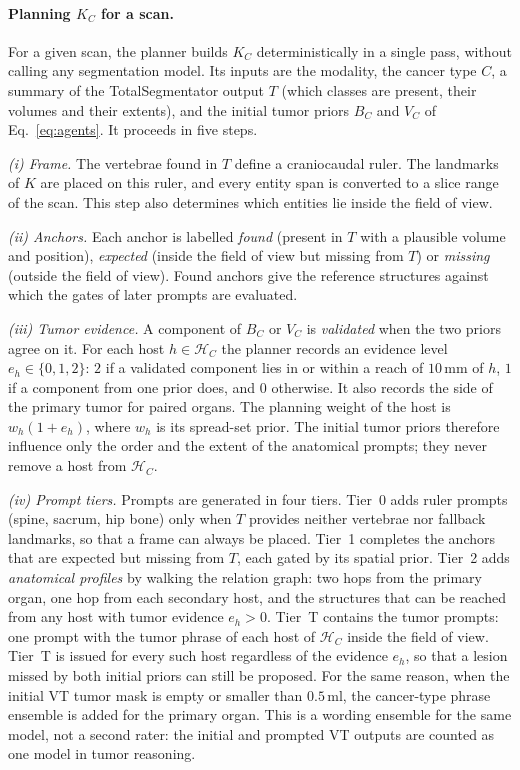 \documentclass[fleqn,10pt]{olplainarticle}
\begin{document}
\paragraph{Planning $K_C$ for a scan.}
For a given scan, the planner builds $K_C$ deterministically in a single pass, without calling any segmentation model.
Its inputs are the modality, the cancer type $C$, a summary of the TotalSegmentator output $T$ (which classes are
present, their volumes and their extents), and the initial tumor priors $B_C$ and $V_C$ of Eq.~\eqref{eq:agents}.
It proceeds in five steps.

\emph{(i) Frame.} The vertebrae found in $T$ define a craniocaudal ruler. The landmarks of $K$ are placed on this ruler,
and every entity span is converted to a slice range of the scan. This step also determines which entities lie inside the
field of view.

\emph{(ii) Anchors.} Each anchor is labelled \emph{found} (present in $T$ with a plausible volume and position),
\emph{expected} (inside the field of view but missing from $T$) or \emph{missing} (outside the field of view). Found
anchors give the reference structures against which the gates of later prompts are evaluated.

\emph{(iii) Tumor evidence.} A component of $B_C$ or $V_C$ is \emph{validated} when the two priors agree on it. For each
host $h\in\mathcal{H}_C$ the planner records an evidence level $e_h\in\{0,1,2\}$: $2$ if a validated component lies in
or within a reach of $10$\,mm of $h$, $1$ if a component from one prior does, and $0$ otherwise. It also records the
side of the primary tumor for paired organs. The planning weight of the host is $w_h(1+e_h)$, where $w_h$ is its
spread-set prior. The initial tumor priors therefore influence only the order and the extent of the anatomical
prompts; they never remove a host from $\mathcal{H}_C$.

\emph{(iv) Prompt tiers.} Prompts are generated in four tiers. Tier~0 adds ruler prompts (spine, sacrum, hip bone) only
when $T$ provides neither vertebrae nor fallback landmarks, so that a frame can always be placed. Tier~1 completes the anchors that are expected but missing from $T$, each gated by its
spatial prior. Tier~2 adds \emph{anatomical profiles} by walking the relation graph: two hops from the primary organ,
one hop from each secondary host, and the structures that can be reached from any host with tumor evidence
$e_h>0$. Tier~T contains the tumor prompts: one prompt with the tumor phrase of each host of $\mathcal{H}_C$ inside the
field of view. Tier~T is issued for every such host regardless of the evidence $e_h$, so that a lesion missed by both
initial priors can still be proposed. For the same reason, when the initial VT tumor mask is empty or smaller than
$0.5$\,ml, the cancer-type phrase ensemble is added for the primary organ. This is a wording ensemble for the same
model, not a second rater: the initial and prompted VT outputs are counted as one model in tumor reasoning.
\end{document}

